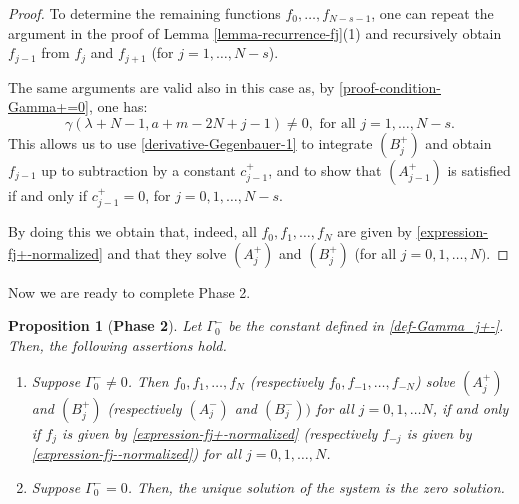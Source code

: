 \documentclass[12pt, pdflatex, a4paper]{article}
\theoremstyle{plain}
\newtheorem{prop}[thm]{Proposition}
\theoremstyle{definition}
\begin{document}
\begin{proof}
To determine the remaining functions $f_0, \ldots, f_{N-s-1}$, one can repeat the argument in the proof of Lemma \ref{lemma-recurrence-fj}(1) and recursively obtain $f_{j-1}$ from $f_{j}$ and $f_{j+1}$ (for $j = 1, \ldots, N-s$).

The same arguments are valid also in this case as, by \eqref{proof-condition-Gamma+=0}, one has:
\begin{equation*}
\gamma(\lambda+N-1, a+m-2N+j-1)\neq 0, \text{ for all } j = 1, \ldots, N-s.
\end{equation*}
This allows us to use \eqref{derivative-Gegenbauer-1} to integrate $(B_j^+)$ and obtain $f_{j-1}$ up to subtraction by a constant $c_{j-1}^+$, and to show that $(A_{j-1}^+)$ is satisfied if and only if $c_{j-1}^+ = 0$, for $j = 0, 1, \ldots, N-s$.

By doing this we obtain that, indeed, all $f_{0}, f_1, \ldots, f_N$ are given by \eqref{expression-fj+-normalized} and that they solve $(A_{j}^+)$ and $(B_j^+)$ (for all $j = 0, 1, \ldots, N)$.
\end{proof}

Now we are ready to complete Phase 2.

\begin{prop}[\textbf{Phase 2}]\label{prop-phase2}
Let $\Gamma_0^-$ be the constant defined in \eqref{def-Gamma_j+-}. Then, the following assertions hold.
\begin{enumerate}[label=\normalfont{(\arabic*)}]
\item Suppose $\Gamma_0^- \neq 0$. Then $f_0, f_1, \ldots, f_N$ (respectively $f_{0}, f_{-1}, \ldots, f_{-N}$) solve $(A_j^+)$ and $(B_j^+)$ (respectively $(A_j^-)$ and $(B_j^-))$ for all $j = 0, 1, \ldots N$, if and only if $f_j$ is given by \eqref{expression-fj+-normalized} (respectively $f_{-j}$ is given by \eqref{expression-fj--normalized}) for all $j = 0, 1, \ldots, N$.

\item Suppose $\Gamma_0^- = 0$. Then, the unique solution of the system is the zero solution.
\end{enumerate}
\end{prop}
\end{document}
